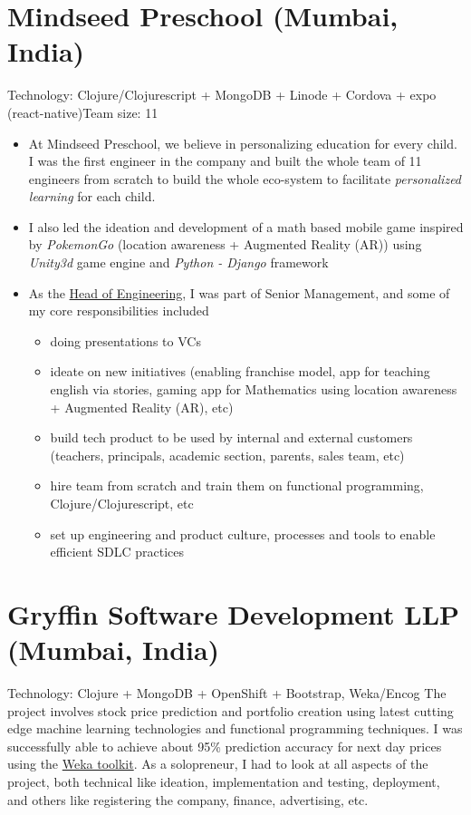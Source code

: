 \documentclass[11pt,a4paper,sans]{moderncv} %
\newcommand\Colorhref[3][blue]{\href{#2}{\small\color{#1}#3}}
\begin{document}
\section{Mindseed Preschool (Mumbai, India)}
         {Technology: Clojure/Clojurescript + MongoDB + Linode + Cordova + expo (react-native)}{Team size: 11}
         {\begin{itemize}
             \item At Mindseed Preschool, we believe in personalizing education for every child. I was the first engineer in the company and built the whole team of 11 engineers from scratch to build the whole eco-system to facilitate \textit{personalized learning} for each child.
             \item I also led the ideation and development of a math based mobile game inspired by \textit{PokemonGo} (location awareness + Augmented Reality (AR)) using \textit{Unity3d} game engine and \textit{Python - Django} framework
             \item As the \Colorhref{http://mindseed.in/about-us/our-team/}{Head of Engineering}, I was part of Senior Management, and some of my core responsibilities included
            \begin{itemize}
              \item doing presentations to VCs
              \item ideate on new initiatives (enabling franchise model, app for teaching english via stories, gaming app for Mathematics using location awareness + Augmented Reality (AR), etc)
              \item build tech product to be used by internal and external customers (teachers, principals, academic section, parents, sales team, etc)
              \item hire team from scratch and train them on functional programming, Clojure/Clojurescript, etc
              \item set up engineering and product culture, processes and tools to enable efficient SDLC practices
            \end{itemize}
         \end{itemize}}

\newpage
\section{Gryffin Software Development LLP (Mumbai, India)}
         {}{Technology: Clojure + MongoDB + OpenShift + Bootstrap, Weka/Encog}
         {The project involves stock price prediction and portfolio creation using latest cutting edge machine learning technologies and functional programming techniques. I was successfully able to achieve about 95\% prediction accuracy for next day prices using the \Colorhref{https://weka.8497.n7.nabble.com/how-to-use-non-target-attributes-for-timeseries-prediction-in-weka-td35191.html}{Weka toolkit}. As a solopreneur, I had to look at all aspects of the project, both technical like ideation, implementation and testing, deployment, and others like registering the company, finance, advertising, etc.}
\end{document}
